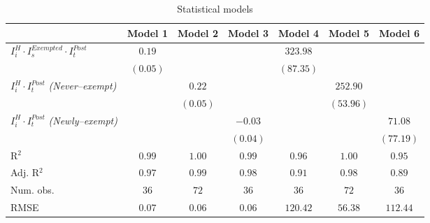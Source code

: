 
\begin{table}
\begin{center}
\begin{tabular}{l c c c c c c}
\hline
 & Model 1 & Model 2 & Model 3 & Model 4 & Model 5 & Model 6 \\
\hline
$ I_i^H \cdot I_s^{Exempted} \cdot I_t^{Post} $                             & $0.19$   &          &          & $323.98$  &           &           \\
                                                                            & $(0.05)$ &          &          & $(87.35)$ &           &           \\
$ I_i^H \cdot I_t^{Post} $ \textit{(Never--exempt)} \quad \quad \quad \quad &          & $0.22$   &          &           & $252.90$  &           \\
                                                                            &          & $(0.05)$ &          &           & $(53.96)$ &           \\
$ I_i^H \cdot I_t^{Post} $ \textit{(Newly--exempt)}                         &          &          & $-0.03$  &           &           & $71.08$   \\
                                                                            &          &          & $(0.04)$ &           &           & $(77.19)$ \\
\hline
R$^2$                                                                       & $0.99$   & $1.00$   & $0.99$   & $0.96$    & $1.00$    & $0.95$    \\
Adj. R$^2$                                                                  & $0.97$   & $0.99$   & $0.98$   & $0.91$    & $0.98$    & $0.89$    \\
Num. obs.                                                                   & $36$     & $72$     & $36$     & $36$      & $72$      & $36$      \\
RMSE                                                                        & $0.07$   & $0.06$   & $0.06$   & $120.42$  & $56.38$   & $112.44$  \\
\hline
\end{tabular}
\caption{Statistical models}
\label{table:coefficients}
\end{center}
\end{table}

